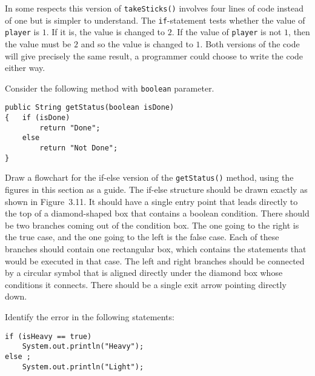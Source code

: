 \noindent In some respects this version of {\tt takeSticks()}
involves four lines of code instead of one but is simpler
to understand. The {\tt if}-statement tests whether the value of {\tt player}
is $1$.  If it is, the value is changed to $2$.  If the value of {\tt player}
is not $1$, then the value must be $2$ and so the value is changed to $1$.
Both versions of the code will give precisely the same result, a programmer
could choose to write the code either way.


\label{self-study-exercises}
\begin{SSTUDY}

\item  Consider the following method with
{\tt boolean} parameter.

\begin{jjjlisting}
\begin{lstlisting}
public String getStatus(boolean isDone)
{   if (isDone)
        return "Done";
    else
        return "Not Done";
}
\end{lstlisting}
\end{jjjlisting}

\noindent Draw a flowchart for the if-else version of the
{\tt getStatus()} method, using the figures in this section as a
guide.  The if-else structure should be drawn exactly as shown in
Figure~3.11. It should have a single entry point that leads directly
to the top of a diamond-shaped box that contains a boolean condition.
There should be two branches coming out of the condition box.  The one
going to the right is the true case, and the one going to the left is
the false case.  Each of these branches should contain one rectangular
box, which contains the statements that would be executed in that
case.  The left and right branches should be connected by a circular
symbol that is aligned directly under the diamond box whose conditions
it connects.  There should be a single exit arrow pointing directly
down.


\item  Identify the error in the following statements:

\begin{jjjlisting}
\begin{lstlisting}
if (isHeavy == true)
    System.out.println("Heavy");
else ;
    System.out.println("Light");


\end{lstlisting}
\end{jjjlisting}
\end{SSTUDY}
